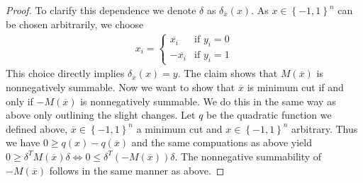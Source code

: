 \documentclass[12pt,a4paper]{article}
\theoremstyle{mythm}
\begin{document}
\begin{proof}
To clarify this dependence we denote $ \delta $ as $ \delta _{ \overline{ x }  } \left( x \right)  $.
As $ x \in \left\{ -1,1 \right\} ^{ n } $ can be chosen arbitrarily, we choose
\begin{align*}
x_i = \begin{cases}
\overline{ x_i }  & \text{if } y_i=0 \\
- \overline{ x_i } & \text{if } y_i=1
\end{cases}
\end{align*} 
This choice directly implies $ \delta _{ \overline{ x }  } \left( x \right) = y $.
The claim shows that $ M ( \overline{ x }  )  $ is nonnegatively summable.
Now we want to show that $ \overline{ x }  $ is minimum cut if and only if $ -  M( \overline{ x } ) $ is nonnegatively summable. 
We do this in the same way as above only outlining the slight changes. Let $ q $ be the quadratic function we defined above, $ \overline{ x } \in \left\{ -1,1 \right\} ^{ n }
$ a minimum cut and $ x \in \left\{ -1,1 \right\} ^{ n }  $ arbitrary. Thus we have $ 0 \geq  q(x) - q( \overline{ x } ) $ and the same compuations as above yield $ 0 \geq
\delta ^T M ( \overline{ x } ) \delta \Leftrightarrow 0 \leq \delta ^T  \left( -M( \overline{ x } ) \right) \delta  $. The nonnegative summability of $ - M(
\overline{ x } ) $ follows in the same manner as above.
\end{proof}
\end{document}
